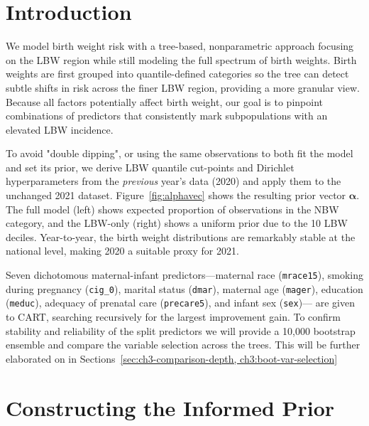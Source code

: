 \section{Introduction}
\label{sec:ch3-introduction}
We model birth weight risk with a tree-based, nonparametric approach focusing on the LBW region while still modeling the full spectrum of birth weights. Birth weights are first grouped into quantile-defined categories so the tree can detect subtle shifts in risk across the finer LBW region, providing a more granular view. Because all factors potentially affect birth weight, our goal is to pinpoint combinations of predictors that consistently mark subpopulations with an elevated LBW incidence. 

To avoid "double dipping", or using the same observations to both fit the model and set its prior, we derive LBW quantile cut-points and Dirichlet hyperparameters from the \emph{previous} year's data (2020) and apply them to the unchanged 2021 dataset. Figure~\ref{fig:alphavec}
 shows the resulting prior vector \(\boldsymbol\alpha\). The full model (left) shows expected proportion of observations in the NBW category, and the LBW-only (right) shows a uniform prior due to the 10 LBW deciles. Year-to-year, the birth weight distributions are remarkably stable at the national level, making 2020 a suitable proxy for 2021.

Seven dichotomous maternal-infant predictors—maternal race (\texttt{mrace15}), smoking during pregnancy (\texttt{cig\_0}), marital status (\texttt{dmar}), maternal age (\texttt{mager}), education (\texttt{meduc}), adequacy of prenatal care (\texttt{precare5}), and infant sex (\texttt{sex})— are given to CART, searching recursively for the largest improvement gain. To confirm stability and reliability of the split predictors we will provide a 10,000 bootstrap ensemble and compare the variable selection across the trees. This will be further elaborated on in Sections~\ref{sec:ch3-comparison-depth, ch3:boot-var-selection}

\section{Constructing the Informed Prior}
\label{sec:ch3-prior}

